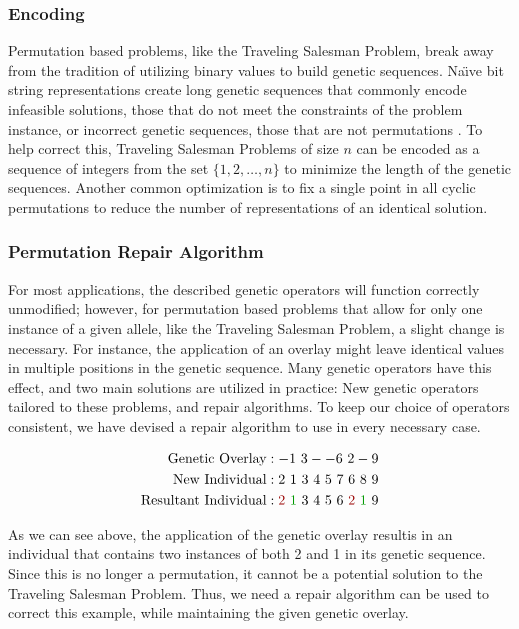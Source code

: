 \subsubsection*{Encoding}
Permutation based problems, like the Traveling Salesman Problem, break away from the tradition of utilizing binary values to build genetic sequences. Na\"{\i}ve bit string representations create long genetic sequences that commonly encode infeasible solutions, those that do not meet the constraints of the problem instance, or incorrect genetic sequences, those that are not permutations \cite{Potvin96}. To help correct this, Traveling Salesman Problems of size $n$ can be encoded as a sequence of integers from the set $\{1, 2, \ldots, n\}$ to minimize the length of the genetic sequences. Another common optimization is to fix a single point in all cyclic permutations to reduce the number of representations of an identical solution. 

\subsubsection*{Permutation Repair Algorithm}
For most applications, the described genetic operators will function correctly unmodified; however, for permutation based problems that allow for only one instance of a given allele, like the Traveling Salesman Problem, a slight change is necessary. For instance, the application of an overlay might leave identical values in multiple positions in the genetic sequence. Many genetic operators have this effect, and two main solutions are utilized in practice: New genetic operators tailored to these problems, and repair algorithms\cite{Larranaga99}. To keep our choice of operators consistent, we have devised a repair algorithm to use in every necessary case.
 
\begin{align*}
\text{Genetic Overlay} &:   -1~3--6~2-9				\\
\text{New Individual} &: 2~1~3~4~5~7~6~8~9			\\		
\text{Resultant Individual} &: {\color{myred}2}~{\color{mygreen}1}~3~4~5~6~{\color{myred}2}~{\color{mygreen}1}~9
\end{align*}

As we can see above, the application of the genetic overlay resultis in an individual that contains two instances of both 2 and 1 in its genetic sequence. Since this is no longer a permutation, it cannot be a potential solution to the Traveling Salesman Problem. Thus, we need a repair algorithm can be used to correct this example, while maintaining the given genetic overlay. 

